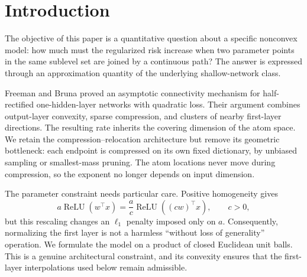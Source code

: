\documentclass[smallextended,envcountsect]{svjour3}
\newcommand{\relu}{\operatorname{ReLU}}
\begin{document}
\section{Introduction}\label{sec:introduction}

The objective of this paper is a quantitative question about a specific nonconvex model: how much must the regularized risk increase when two parameter points in the same sublevel set are joined by a continuous path?  The answer is expressed through an approximation quantity of the underlying shallow-network class.

Freeman and Bruna \cite{FreemanBruna2017} proved an asymptotic connectivity mechanism for half-rectified one-hidden-layer networks with quadratic loss. Their argument combines output-layer convexity, sparse compression, and clusters of nearby first-layer directions. The resulting rate inherits the covering dimension of the atom space. We retain the compression--relocation architecture but remove its geometric bottleneck: each endpoint is compressed on its own fixed dictionary, by unbiased sampling or smallest-mass pruning. The atom locations never move during compression, so the exponent no longer depends on input dimension.

The parameter constraint needs particular care. Positive homogeneity gives
\[
 a\relu(w^\top x)=\frac{a}{c}\relu((cw)^\top x),\qquad c>0,
\]
but this rescaling changes an $\ell_1$ penalty imposed only on $a$. Consequently, normalizing the first layer is not a harmless ``without loss of generality'' operation. We formulate the model on a product of closed Euclidean unit balls. This is a genuine architectural constraint, and its convexity ensures that the first-layer interpolations used below remain admissible.
\end{document}
